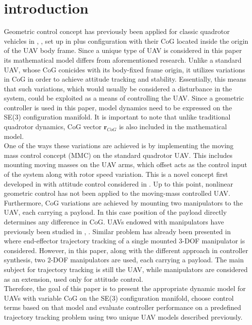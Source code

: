 \section{introduction}

Geometric control concept has previously been applied for classic quadrotor vehicles in \cite{LeeClanak4}, \cite{LeeClanak3}, \cite{LeeClanak1} set up in plus configuration with their CoG located inside the origin of the UAV body frame. Since a unique type of UAV is considered in this paper its mathematical model differs from aforementioned research. Unlike a standard UAV, whose CoG conicides with its body-fixed frame origin, it utilizes variations in CoG in order to achieve attitude tracking and stability. Essentially, this means that such variations, which would usually be considered a disturbance in the system, could be exploited as a means of controlling the UAV. Since a geometric controller is used in this paper, model dynamics need to be expressed on the SE(3) configuration manifold. It is important to note that unlike traditional quadrotor dynamics, CoG vector $\textbf{r}_{CoG}$ is also included in the mathematical model.\\ 
One of the ways these variations are achieved is by implementing the moving mass control concept (MMC)\cite{movingMass1} on the standard quadrotor UAV. This includes mounting moving masses on the UAV arms, which offset acts as the control input of the system along with rotor speed variation. This is a novel concept first developed in \cite{movingMass2} with attitude control considered in \cite{movingMass3}. Up to this point, nonlinear geometric control has not been applied to the moving-mass controlled UAV.  \\
Furthermore, CoG variations are achieved by mounting two manipulators to the UAV, each carrying a payload. In this case position of the payload directly determines any difference in CoG. UAVs endowed with manipulators have previously been studied in \cite{manipulator1}, \cite{manipulator2}. Similar problem has already been presented in \cite{manipulator3} where end-effector trajectory tracking of a single mounted 3-DOF manipulator is considered. However, in this paper, along with the different approach in controller synthesis, two 2-DOF manipulators are used, each carrying a payload. The main subject for trajectory tracking is still the UAV, while manipulators are considered as an extension, used only for attitude control. \\
Therefore, the goal of this paper is to present the appropriate dynamic model for UAVs with variable CoG on the SE(3) configuration manifold, choose control terms based on that model and evaluate controller performance on a predefined trajectory tracking problem using two unique UAV models described previously. \\
